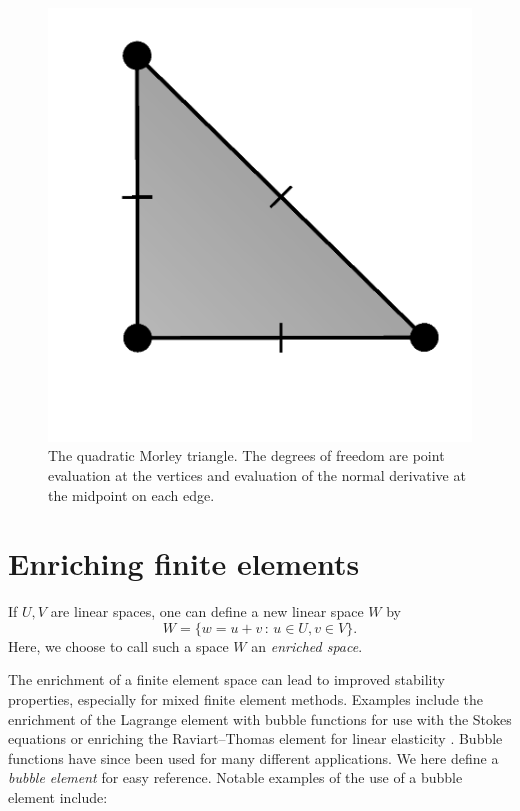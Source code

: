 \begin{figure}
  \centering
  \includegraphics[width=\smallfig]{chapters/kirby-6/png/MOR_2d.png}
  \caption{The quadratic Morley triangle. The degrees of freedom are
    point evaluation at the vertices and evaluation of the normal
      derivative at the midpoint on each edge.}
\end{figure}

\section{Enriching finite elements}

If $U, V$ are linear spaces, one can define a new linear space $W$ by
\begin{equation}
  W = \{ w = u + v \, : \, u \in U, v \in V \}.
\end{equation}
Here, we choose to call such a space $W$ an \emph{enriched space}.

The enrichment of a finite element space can lead to improved
stability properties, especially for mixed finite element
methods. Examples include the enrichment of the Lagrange element with
bubble functions for use with the Stokes equations or enriching the
Raviart--Thomas element for linear elasticity
\citep{ArnoldBrezziDouglas1984, ArnoldBrezziFortin1984}. Bubble
functions have since been used for many different applications. We
here define a \emph{bubble element} for easy reference. Notable
examples of the use of a bubble element include:
